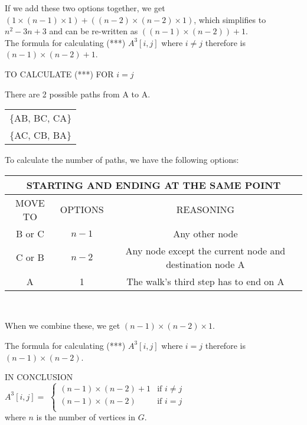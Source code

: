 \documentclass[12pt]{article}
\begin{document}
If we add these two options together, we get $(1 \times (n-1) \times 1) +  ((n-2) \times (n-2) \times 1)$, which simplifies to $n^{2} - 3n +3$ and can be re-written as $((n-1) \times (n-2)) + 1$. \\


The formula for calculating (***) $A^{3}[i, j]$ where $i \neq j$ therefore is $(n-1) \times (n-2) + 1$.

\begin{center}
\Large TO CALCULATE (***) FOR $i = j$
\end{center}
\normalsize

There are 2 possible paths from A to A. \\
\begin{center}
\begin{tabular}{|c|}  \hline
\{AB, BC, CA\} \\
\{AC, CB, BA\} \\ \hline
\end{tabular}
\end{center}

To calculate the number of paths, we have the following options: \\
\begin{center}
\begin{tabular}{|c|c|c|}
\multicolumn{3}{c}{STARTING AND ENDING AT THE SAME POINT}  \\ \hline
MOVE TO & OPTIONS & REASONING \\ \hline
B or C & $n-1$ & Any other node\\ \hline
C or B &$n-2$ & Any node except the current node and destination node A \\ \hline
A & 1 & The walk's third step has to end on A \\ \hline
\end{tabular} \\
\end{center}

When we combine these, we get $(n-1) \times (n-2) \times 1$.

The formula for calculating (***) $A^{3}[i, j]$ where $i = j$ therefore is $(n-1) \times (n-2)$.

\begin{center}
\Large IN CONCLUSION \\

\normalsize
$ A^{3}[i,j] = $ 
    $\begin{cases} (n-1) \times (n-2) + 1  & \mbox{if } i \neq  j  \\  (n-1) \times (n-2)   & \mbox{if } i =j \\   \end{cases}$ \\
    where $n$ is the number of vertices in $G$. \\
\end{center}
\end{document}
